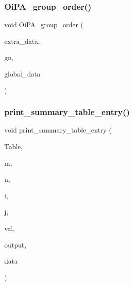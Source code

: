 \mbox{\label{projective__space__main_8_c_ad91b5a6d2b35b598a5df99ce37f85a10}} 
\subsubsection{\texorpdfstring{Oi\+P\+A\+\_\+group\+\_\+order()}{OiPA\_group\_order()}}
{\footnotesize\ttfamily void Oi\+P\+A\+\_\+group\+\_\+order (\begin{DoxyParamCaption}\item[{void $\ast$}]{extra\+\_\+data,  }\item[{\mbox{\hyperlink{classlonginteger__object}{longinteger\+\_\+object}} \&}]{go,  }\item[{void $\ast$}]{global\+\_\+data }\end{DoxyParamCaption})}

\mbox{\label{projective__space__main_8_c_a596b002a0d850d6639f26abf716124ed}} 
\subsubsection{\texorpdfstring{print\+\_\+summary\+\_\+table\+\_\+entry()}{print\_summary\_table\_entry()}}
{\footnotesize\ttfamily void print\+\_\+summary\+\_\+table\+\_\+entry (\begin{DoxyParamCaption}\item[{\mbox{\hyperlink{galois_8h_a09fddde158a3a20bd2dcadb609de11dc}{I\+NT}} $\ast$}]{Table,  }\item[{\mbox{\hyperlink{galois_8h_a09fddde158a3a20bd2dcadb609de11dc}{I\+NT}}}]{m,  }\item[{\mbox{\hyperlink{galois_8h_a09fddde158a3a20bd2dcadb609de11dc}{I\+NT}}}]{n,  }\item[{\mbox{\hyperlink{galois_8h_a09fddde158a3a20bd2dcadb609de11dc}{I\+NT}}}]{i,  }\item[{\mbox{\hyperlink{galois_8h_a09fddde158a3a20bd2dcadb609de11dc}{I\+NT}}}]{j,  }\item[{\mbox{\hyperlink{galois_8h_a09fddde158a3a20bd2dcadb609de11dc}{I\+NT}}}]{val,  }\item[{\mbox{\hyperlink{galois_8h_ab6cc7b4aeb6ea31aba2b3fbfc83ff5e6}{B\+Y\+TE}} $\ast$}]{output,  }\item[{void $\ast$}]{data }\end{DoxyParamCaption})}

